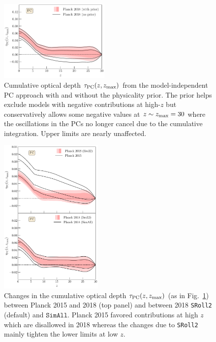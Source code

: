 \documentclass[prd,twocolumn,amsmath,amssymb,floatfix,superscriptaddress,nofootinbib]{revtex4-1}
\newcommand{\zmax}{z_{\rm max}}
\begin{document}
{\begin{figure}[ht]
\includegraphics[width=0.48\textwidth]{paper/plots/pl18_taugtz_pc_zmax30_pl18_srollv2_with_and_without_physicality_prior_do_rescale_tau_false.pdf}
\caption{Cumulative optical depth $\tau_{\rm PC}(z, \zmax)$ from the model-independent PC approach with and without the physicality prior.   The prior helps exclude models with negative contributions at high-$z$ but conservatively allows some negative values at $z \sim z_{\rm max}=30$ where the oscillations in the PCs no longer cancel due to the cumulative integration.  Upper limits are nearly unaffected. 
}
\label{fig:plot_taugtz_2018_with_vs_without_physicality_prior}
\end{figure}


\begin{figure}[ht]
\includegraphics[width=0.45\textwidth]{paper/plots/pl18_taugtz_pc_zmax30_pl15_vs_pl18_simallEE_vs_pl18_srollv2_do_rescale_tau_false.pdf}
\caption{Changes in the
cumulative optical depth $\tau_{\rm PC}(z, \zmax)$ (as in Fig.~\ref{fig:plot_taugtz_2018_with_vs_without_physicality_prior}) 
between Planck 2015 and 2018 (top panel) and between 2018 \texttt{SRoll2} (default) and $\texttt{SimAll}$.  Planck 2015 favored contributions at high $z$ which are disallowed in 2018 whereas the changes due to \texttt{SRoll2} mainly tighten the lower limits at low $z$.
}
\label{fig:plot_taugtz_2015_vs_2018_simallEE_vs_2018_srollv2}
\end{figure}


}
\end{document}
